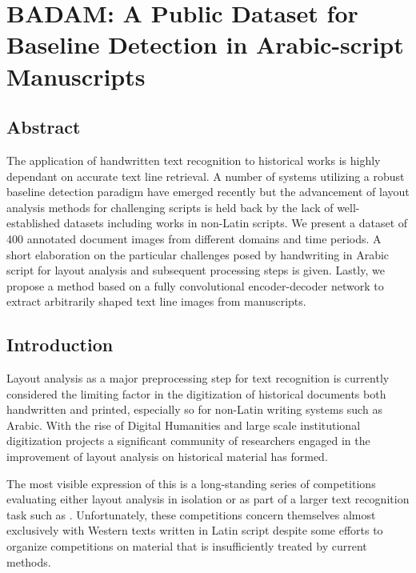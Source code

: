 \chapter{BADAM: A Public Dataset for Baseline Detection in Arabic-script Manuscripts}
\label{ch:hip}
\section{Abstract}
	The application of handwritten text recognition to historical works is
	highly dependant on accurate text line retrieval. A number of systems
	utilizing a robust baseline detection paradigm have emerged recently
	but the advancement of layout analysis methods for challenging scripts
	is held back by the lack of well-established datasets including works
	in non-Latin scripts. We present a dataset of 400 annotated document
	images from different domains and time periods. A short elaboration on
	the particular challenges posed by handwriting in Arabic script for
	layout analysis and subsequent processing steps is given.  Lastly, we
	propose a method based on a fully convolutional encoder-decoder network
	to extract arbitrarily shaped text line images from manuscripts.

\section{Introduction}

Layout analysis as a major preprocessing step for text recognition is currently
considered the limiting factor in the digitization of historical documents both
handwritten and printed, especially so for non-Latin writing systems such as
Arabic. With the rise of Digital Humanities and large scale institutional
digitization projects a significant community of researchers engaged in the
improvement of layout analysis on historical material has formed.

The most visible expression of this is a long-standing series of competitions
evaluating either layout analysis in isolation
\cite{gatos2011icdar2009,antonacopoulos2009icdar,gatos2010icfhr,antonacopoulos2011historical,antonacopoulos2013icdar,murdock2015icdar,diem2017cbad}
or as part of a larger text recognition task such as
\cite{antonacopoulos2015icdar2015}. Unfortunately, these competitions concern
themselves almost exclusively with Western texts written in Latin script
despite some efforts to organize competitions on material that is
insufficiently treated by current methods.

